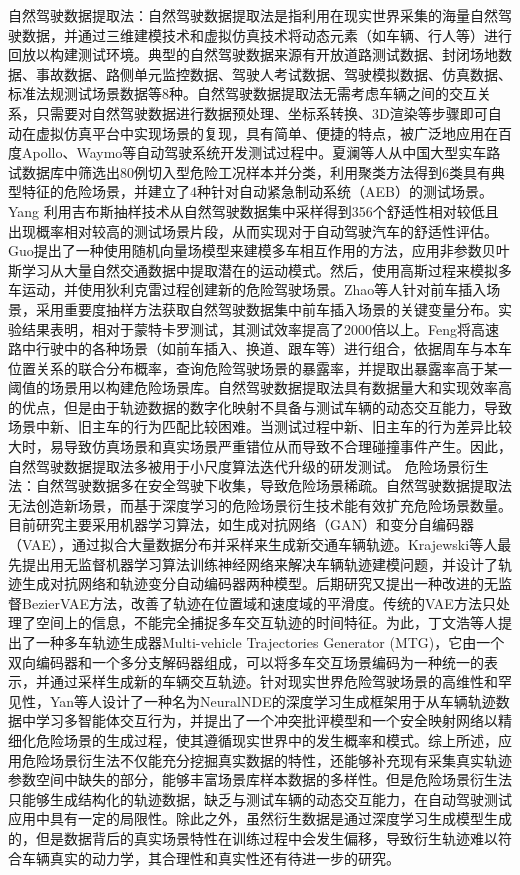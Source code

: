 自然驾驶数据提取法：自然驾驶数据提取法是指利用在现实世界采集的海量自然驾驶数据，并通过三维建模技术和虚拟仿真技术将动态元素（如车辆、行人等）进行回放以构建测试环境。典型的自然驾驶数据来源有开放道路测试数据、封闭场地数据、事故数据、路侧单元监控数据、驾驶人考试数据、驾驶模拟数据、仿真数据、标准法规测试场景数据等8种。自然驾驶数据提取法无需考虑车辆之间的交互关系，只需要对自然驾驶数据进行数据预处理、坐标系转换、3D渲染等步骤即可自动在虚拟仿真平台中实现场景的复现，具有简单、便捷的特点，被广泛地应用在百度Apollo、Waymo等自动驾驶系统开发测试过程中。夏澜等人从中国大型实车路试数据库中筛选出80例切入型危险工况样本并分类，利用聚类方法得到6类具有典型特征的危险场景，并建立了4种针对自动紧急制动系统（AEB）的测试场景。Yang 利用吉布斯抽样技术从自然驾驶数据集中采样得到356个舒适性相对较低且出现概率相对较高的测试场景片段，从而实现对于自动驾驶汽车的舒适性评估。Guo提出了一种使用随机向量场模型来建模多车相互作用的方法，应用非参数贝叶斯学习从大量自然交通数据中提取潜在的运动模式。然后，使用高斯过程来模拟多车运动，并使用狄利克雷过程创建新的危险驾驶场景。Zhao等人针对前车插入场景，采用重要度抽样方法获取自然驾驶数据集中前车插入场景的关键变量分布。实验结果表明，相对于蒙特卡罗测试，其测试效率提高了2000倍以上。Feng将高速路中行驶中的各种场景（如前车插入、换道、跟车等）进行组合，依据周车与本车位置关系的联合分布概率，查询危险驾驶场景的暴露率，并提取出暴露率高于某一阈值的场景用以构建危险场景库\cite{sayer2011integrated}。自然驾驶数据提取法具有数据量大和实现效率高的优点，但是由于轨迹数据的数字化映射不具备与测试车辆的动态交互能力，导致场景中新、旧主车的行为匹配比较困难。当测试过程中新、旧主车的行为差异比较大时，易导致仿真场景和真实场景严重错位从而导致不合理碰撞事件产生。因此，自然驾驶数据提取法多被用于小尺度算法迭代升级的研发测试。
危险场景衍生法：自然驾驶数据多在安全驾驶下收集，导致危险场景稀疏。自然驾驶数据提取法无法创造新场景，而基于深度学习的危险场景衍生技术能有效扩充危险场景数量。目前研究主要采用机器学习算法，如生成对抗网络（GAN）和变分自编码器（VAE），通过拟合大量数据分布并采样来生成新交通车辆轨迹。Krajewski等人最先提出用无监督机器学习算法训练神经网络来解决车辆轨迹建模问题，并设计了轨迹生成对抗网络和轨迹变分自动编码器两种模型。后期研究又提出一种改进的无监督BezierVAE方法，改善了轨迹在位置域和速度域的平滑度。传统的VAE方法只处理了空间上的信息，不能完全捕捉多车交互轨迹的时间特征。为此，丁文浩等人提出了一种多车轨迹生成器Multi-vehicle Trajectories Generator (MTG)，它由一个双向编码器和一个多分支解码器组成，可以将多车交互场景编码为一种统一的表示，并通过采样生成新的车辆交互轨迹。针对现实世界危险驾驶场景的高维性和罕见性，Yan等人设计了一种名为NeuralNDE的深度学习生成框架用于从车辆轨迹数据中学习多智能体交互行为，并提出了一个冲突批评模型和一个安全映射网络以精细化危险场景的生成过程，使其遵循现实世界中的发生概率和模式。综上所述，应用危险场景衍生法不仅能充分挖掘真实数据的特性，还能够补充现有采集真实轨迹参数空间中缺失的部分，能够丰富场景库样本数据的多样性。但是危险场景衍生法只能够生成结构化的轨迹数据，缺乏与测试车辆的动态交互能力，在自动驾驶测试应用中具有一定的局限性。除此之外，虽然衍生数据是通过深度学习生成模型生成的，但是数据背后的真实场景特性在训练过程中会发生偏移，导致衍生轨迹难以符合车辆真实的动力学，其合理性和真实性还有待进一步的研究。\cite{eichmann2023autonomous}
